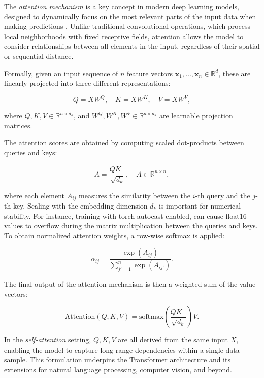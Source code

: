The \textit{attention mechanism} is a key concept in modern deep learning models, designed to dynamically focus on the most relevant parts of the input data when making predictions \cite{vaswani2023attentionneed}. Unlike traditional convolutional operations, which process local neighborhoods with fixed receptive fields, attention allows the model to consider relationships between all elements in the input, regardless of their spatial or sequential distance.  

Formally, given an input sequence of $n$ feature vectors $\mathbf{x}_1, \ldots, \mathbf{x}_n \in \mathbb{R}^d$, these are linearly projected into three different representations:  

\begin{equation}
Q = XW^Q, \quad K = XW^K, \quad V = XW^V,
\label{Eq:2.1}
\end{equation}

where $Q, K, V \in \mathbb{R}^{n \times d_k}$, and $W^Q, W^K, W^V \in \mathbb{R}^{d \times d_k}$ are learnable projection matrices.  

The attention scores are obtained by computing scaled dot-products between queries and keys:  

\begin{equation}
A = \frac{QK^\top}{\sqrt{d_k}}, \quad A \in \mathbb{R}^{n \times n},
\label{Eq:2.2}
\end{equation}

where each element $A_{ij}$ measures the similarity between the $i$-th query and the $j$-th key. Scaling with the embedding dimension $d_k$ is important for numerical stability. For instance, training with torch autocast enabled, can cause float16 values to overflow during the matrix multiplication between the queries and keys. To obtain normalized attention weights, a row-wise softmax is applied:  

\begin{equation}
\alpha_{ij} = \frac{\exp(A_{ij})}{\sum_{j'=1}^n \exp(A_{ij'})}.
\end{equation}

The final output of the attention mechanism is then a weighted sum of the value vectors:  

\begin{equation}
\text{Attention}(Q, K, V) = \text{softmax}\!\left(\frac{QK^\top}{\sqrt{d_k}}\right)V.
\end{equation}

In the \textit{self-attention} setting, $Q, K, V$ are all derived from the same input $X$, enabling the model to capture long-range dependencies within a single data sample. This formulation underpins the Transformer architecture and its extensions for natural language processing, computer vision, and beyond.

